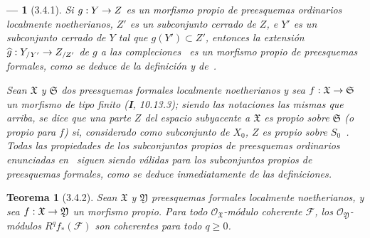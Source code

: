 \documentclass[10pt,oneside,openany]{book}
\theoremstyle{egaenv}\newtheorem*{env}{---}
\theoremstyle{egastatement}
\newtheorem*{theorem}{Teorema}
\theoremstyle{egadescription}
\renewcommand{\geq}{\geqslant}
\renewcommand{\to}{\mathchoice{\longrightarrow}{\rightarrow}{\rightarrow}{\rightarrow}}
\begin{document}
\begin{env}[3.4.1]
Si $g:Y\to Z$ es un morfismo propio de preesquemas ordinarios localmente noetherianos, $Z'$ es un subconjunto cerrado de $Z$, e $Y'$ es un subconjunto cerrado de $Y$ tal que $g(Y')\subset Z'$, entonces la extensión $\widehat g:Y_{/Y'}\to Z_{/Z'}$ de $g$ a las compleciones~ es un morfismo propio de preesquemas formales, como se deduce de la definición y de~.

Sean $\mathfrak X$ y $\mathfrak S$ dos preesquemas formales localmente noetherianos y sea $f:\mathfrak X\to\mathfrak S$ un morfismo \emph{de tipo finito} (\textbf{I}, 10.13.3); siendo las notaciones las mismas que arriba, se dice que una parte $Z$ del espacio subyacente a $\mathfrak X$ es \emph{propio} sobre $\mathfrak S$ (o propio para $f$) si, considerado como subconjunto de $X_0$, $Z$ es \emph{propio sobre $S_0$}~.
Todas las propiedades de los subconjuntos propios de preesquemas ordinarios enunciadas en~ siguen siendo válidas para los subconjuntos propios de preesquemas formales, como se deduce inmediatamente de las definiciones.
\end{env}

\begin{theorem}[3.4.2]
\label{III.3.4.2}
\label{III.3.4.2-fr}
Sean $\mathfrak X$ y $\mathfrak Y$ preesquemas formales localmente noetherianos, y sea $f:\mathfrak X\to\mathfrak Y$ un morfismo propio.
Para todo $\mathcal O_{\mathfrak X}$-módulo coherente $\mathcal F$, los $\mathcal O_{\mathfrak Y}$-módulos $R^qf_*(\mathcal F)$ son coherentes para todo $q\geq0$.
\end{theorem}
\end{document}
